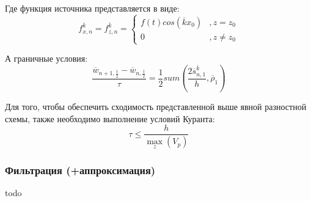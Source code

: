 Где функция источника представляется в виде:
$$
f_{x,n}^{\overline k}=f_{z,n}^{\overline k}=\left\{
  \begin{array}{ccc}
    f(t)cos(\overline k x_0) & , z=z_0 \\
    0 & , z\neq z_0
  \end{array}
\right.
$$

А граничные условия:
$$
\frac{\overline w_{n+1, \frac{1}{2}} - \overline w_{n, \frac{1}{2}}}{\tau}
= \frac{1}{2} sum(\frac{2\overline s_{n,1}^{\overline k}}{h}, \overline\rho_1)
$$

Для того, чтобы обеспечить сходимость представленной выше явной разностной схемы, также необходимо выполнение условий Куранта:
\begin{equation}
\label{eq:10}
\tau \leq \frac{h}{\max\limits_z\left({V_p}\right)}
\end{equation}

\subsubsection{Фильтрация (+аппроксимация)}
todo

\clearpage
